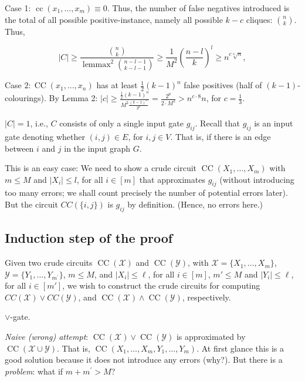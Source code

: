 Case 1: $\operatorname{cc}\left(x_1, \ldots, x_m\right) \equiv 0$.
Thus, the number of false negatives introduced is the total of all possible positive-instance, namely all possible $k-c$ cliques: $\binom{n}{k}$.
Thus,

$$
|C| \geq \frac{\binom{n}{k}}{\operatorname{lemmax}^2\binom{n-l-1}{k-l-1}} \geq \frac{1}{M^2}\left(\frac{n-l}{k}\right)^l \geq n^{c \sqrt[8]{n}},
$$


Case $2: \operatorname{CC}\left(x_1, \ldots, x_n\right)$ has at least $\frac{1}{2}(k-1)^n$ false positives (half of $(k-1)$-colourings).
By Lemma 2: $|c| \geq \frac{\frac{1}{2}(k-1)^n}{M^2 \frac{(k-1)^n}{2^p}}=\frac{2^p}{2 \cdot M^2}>n^{c \cdot 8} n$, for $c=\frac{1}{3}$.


 $|C|=1$, i.e., $C$ consists of only a single input gate $g_{ij}$. Recall that $g_{i j}$ is an input gate denoting whether $(i, j) \in E$, for $i, j \in V$.
That is, if there is an edge between $i$ and $j$ in the input graph $G$.

This is an easy case: We need to show a crude circuit $\operatorname{CC}(X_1, \ldots, X_m)$ with $m \leq M$ and $\left|X_i\right| \leqslant l$, for all $i \in[m]$ that approximates $g_{i j}$ (without introducing too many errors; we shall count precisely the number of potential errors later).
But the circuit $C C(\{i, j\})$ is $g_{i j}$ by definition. (Hence, no errors here.)


\subsection{Induction step of the proof}
Given two crude circuits
$\operatorname{CC}(\mathcal X)$ and 
$\operatorname{CC}(\mathcal Y) 
$, with $\mathcal{X}=\{X_1, \ldots, X_m\}$, 
$\mathcal{Y}=\{Y_1, \ldots, Y_{m^{\prime}}\}$, $m\le M$, and $\left|X_i\right| \leq \ell $, for all $i\in[m]$, $m'\le M $ and $\left|Y_i\right| \leq \ell$, for all $i\in[m']$, we wish to construct the  crude circuits  for computing $CC(\mathcal{X}) \vee CC(\mathcal{Y})$, and $\operatorname{CC}(\mathcal X) \wedge 
\operatorname{CC}(\mathcal Y)$, respectively.

$\lor$-gate.

\textit{Naive (wrong) attempt}: $\operatorname{CC}(\mathcal X)
\lor \operatorname{CC}(\mathcal Y)$ is approximated by $\operatorname{CC}(\mathcal X \cup \mathcal Y)$. That is, $\operatorname{CC}\left(X_1, \ldots, X_m, Y_1, \ldots, Y_m\right)$. At first glance this is a good solution because it does not introduce any errors (why?). But there is a \textit{problem}: what if $m+m^{\prime}>M$?


